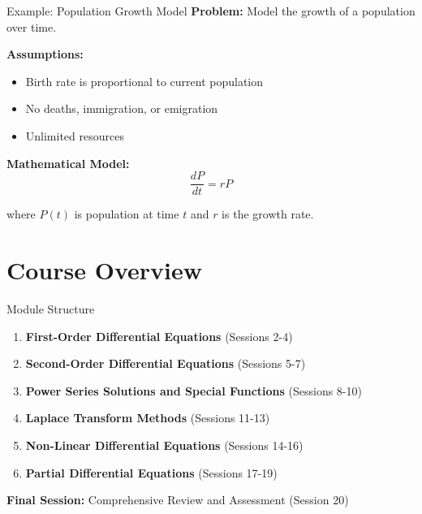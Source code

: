 \documentclass[10pt,aspectratio=169]{beamer}
\begin{document}
\begin{frame}{Example: Population Growth Model}
    \textbf{Problem:} Model the growth of a population over time.
    
    \textbf{Assumptions:}
    \begin{itemize}
        \item Birth rate is proportional to current population
        \item No deaths, immigration, or emigration
        \item Unlimited resources
    \end{itemize}
    
    \textbf{Mathematical Model:}
    \begin{equation}
        \frac{dP}{dt} = rP
    \end{equation}
    
    where $P(t)$ is population at time $t$ and $r$ is the growth rate.
\end{frame}

\section{Course Overview}

\begin{frame}{Module Structure}
    \begin{enumerate}
        \item \textbf{First-Order Differential Equations} (Sessions 2-4)
        \item \textbf{Second-Order Differential Equations} (Sessions 5-7)
        \item \textbf{Power Series Solutions and Special Functions} (Sessions 8-10)
        \item \textbf{Laplace Transform Methods} (Sessions 11-13)
        \item \textbf{Non-Linear Differential Equations} (Sessions 14-16)
        \item \textbf{Partial Differential Equations} (Sessions 17-19)
    \end{enumerate}
    
    \textbf{Final Session:} Comprehensive Review and Assessment (Session 20)
\end{frame}
\end{document}
